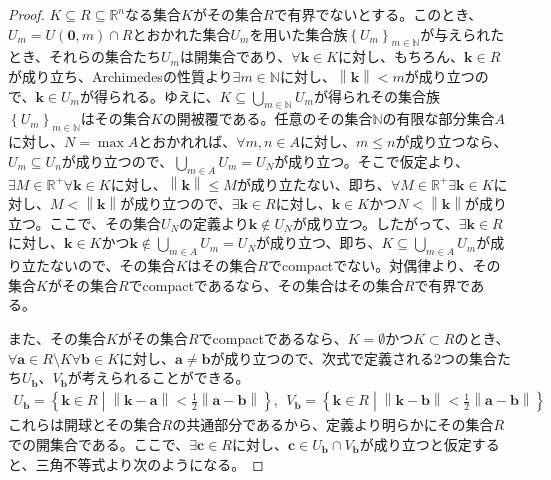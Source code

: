 \documentclass[dvipdfmx]{jsarticle}
\begin{document}
\begin{proof}
$K \subseteq R \subseteq \mathbb{R}^{n}$なる集合$K$がその集合$R$で有界でないとする。このとき、$U_{m} = U\left( \mathbf{0},m \right) \cap R$とおかれた集合$U_{m}$を用いた集合族$\left\{ U_{m} \right\}_{m \in \mathbb{N}}$が与えられたとき、それらの集合たち$U_{m}$は開集合であり、$\forall\mathbf{k} \in K$に対し、もちろん、$\mathbf{k} \in R$が成り立ち、Archimedesの性質より$\exists m \in \mathbb{N}$に対し、$\left\| \mathbf{k} \right\| < m$が成り立つので、$\mathbf{k} \in U_{m}$が得られる。ゆえに、$K \subseteq \bigcup_{m \in \mathbb{N}} U_{m}$が得られその集合族$\left\{ U_{m} \right\}_{m \in \mathbb{N}}$はその集合$K$の開被覆である。任意のその集合$\mathbb{N}$の有限な部分集合$A$に対し、$N = \max A$とおかれれば、$\forall m,n \in A$に対し、$m \leq n$が成り立つなら、$U_{m} \subseteq U_{n}$が成り立つので、$\bigcup_{m \in A} U_{m} = U_{N}$が成り立つ。そこで仮定より、$\exists M \in \mathbb{R}^{+}\forall\mathbf{k} \in K$に対し、$\left\| \mathbf{k} \right\| \leq M$が成り立たない、即ち、$\forall M \in \mathbb{R}^{+}\exists\mathbf{k} \in K$に対し、$M < \left\| \mathbf{k} \right\|$が成り立つので、$\exists\mathbf{k} \in R$に対し、$\mathbf{k} \in K$かつ$N < \left\| \mathbf{k} \right\|$が成り立つ。ここで、その集合$U_{N}$の定義より$\mathbf{k} \notin U_{N}$が成り立つ。したがって、$\exists\mathbf{k} \in R$に対し、$\mathbf{k} \in K$かつ$\mathbf{k} \notin \bigcup_{m \in A} U_{m} = U_{N}$が成り立つ、即ち、$K \subseteq \bigcup_{m \in A} U_{m}$が成り立たないので、その集合$K$はその集合$R$でcompactでない。対偶律より、その集合$K$がその集合$R$でcompactであるなら、その集合はその集合$R$で有界である。\par
また、その集合$K$がその集合$R$でcompactであるなら、$K = \emptyset$かつ$K \subset R$のとき、$\forall\mathbf{a} \in R \setminus K\forall\mathbf{b} \in K$に対し、$\mathbf{a} \neq \mathbf{b}$が成り立つので、次式で定義される2つの集合たち$U_{\mathbf{b}}$、$V_{\mathbf{b}}$が考えられることができる。
\begin{align*}
U_{\mathbf{b}} = \left\{ \mathbf{k} \in R \middle| \left\| \mathbf{k} - \mathbf{a} \right\| < \frac{1}{2}\left\| \mathbf{a} - \mathbf{b} \right\| \right\},\ \ V_{\mathbf{b}} = \left\{ \mathbf{k} \in R \middle| \left\| \mathbf{k} - \mathbf{b} \right\| < \frac{1}{2}\left\| \mathbf{a} - \mathbf{b} \right\| \right\}
\end{align*}
これらは開球とその集合$R$の共通部分であるから、定義より明らかにその集合$R$での開集合である。ここで、$\exists\mathbf{c} \in R$に対し、$\mathbf{c} \in U_{\mathbf{b}} \cap V_{\mathbf{b}}$が成り立つと仮定すると、三角不等式より次のようになる。

\end{proof}
\end{document}
